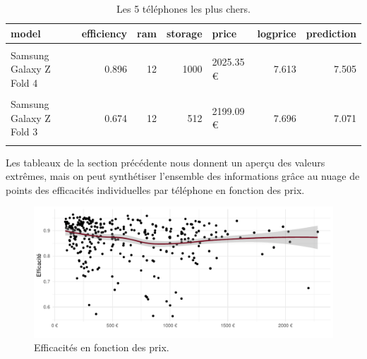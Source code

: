 \documentclass[
  12pt,
]{report}
\begin{document}
\begin{table}[!h]

\caption{\label{tab:kbl_inexpensive}Les 5 téléphones les plus chers.}
\centering
\begin{tabular}[t]{lrrrlrr}
\toprule
\textbf{model} & \textbf{efficiency} & \textbf{ram} & \textbf{storage} & \textbf{price} & \textbf{logprice} & \textbf{prediction}\\
\midrule
\cellcolor{gray!6}{iPhone 15 Pro Max} & \cellcolor{gray!6}{0.916} & \cellcolor{gray!6}{8} & \cellcolor{gray!6}{1000} & \cellcolor{gray!6}{1979 €} & \cellcolor{gray!6}{7.590} & \cellcolor{gray!6}{7.578}\\
Samsung Galaxy Z Fold 4 & 0.896 & 12 & 1000 & 2025.35 € & 7.613 & 7.505\\
\cellcolor{gray!6}{Samsung Galaxy Z Fold 5} & \cellcolor{gray!6}{0.856} & \cellcolor{gray!6}{12} & \cellcolor{gray!6}{512} & \cellcolor{gray!6}{2039 €} & \cellcolor{gray!6}{7.620} & \cellcolor{gray!6}{7.371}\\
Samsung Galaxy Z Fold 3 & 0.674 & 12 & 512 & 2199.09 € & 7.696 & 7.071\\
\cellcolor{gray!6}{Samsung Galaxy Z Fold 5} & \cellcolor{gray!6}{0.896} & \cellcolor{gray!6}{12} & \cellcolor{gray!6}{1000} & \cellcolor{gray!6}{2279 €} & \cellcolor{gray!6}{7.731} & \cellcolor{gray!6}{7.619}\\
\bottomrule
\end{tabular}
\end{table}

\newpage

Les tableaux de la section précédente nous donnent un aperçu des valeurs
extrêmes, mais on peut synthétiser l'ensemble des informations grâce au
nuage de points des efficacités individuelles par téléphone en fonction
des prix.

\begin{figure}[H]

{\centering \includegraphics{report_files/figure-pdf/unnamed-chunk-6-1.pdf}

}

\caption{Efficacités en fonction des prix.}

\end{figure}%
\end{document}
